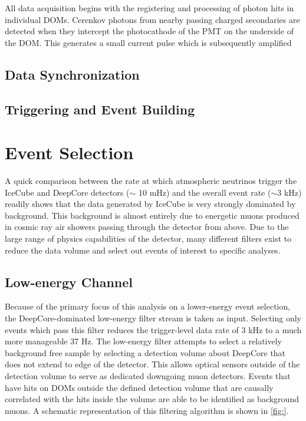 \documentclass{gatech-thesis}
\begin{document}
All data acquisition begins with the registering and processing of photon hits in individual DOMs. Cerenkov photons from nearby passing charged secondaries are detected when they intercept the photocathode of the PMT on the underside of the DOM. This generates a small current pulse which is subsequently amplified 

\section{Data Synchronization}

\section{Triggering and Event Building}


\chapter{Event Selection}
A quick comparison between the rate at which atmospheric neutrinos trigger the IceCube and DeepCore detectors ($\sim$ 10 mHz) and the overall event rate ($\sim 3$ kHz) readily shows that the data generated by IceCube is very strongly dominated by background. This background is almost entirely due to energetic muons produced in cosmic ray air showers passing through the detector from above. Due to the large range of physics capabilities of the detector, many different filters exist to reduce the data volume and select out events of interest to specific analyses. 


\section{Low-energy Channel}

Because of the primary focus of this analysis on a lower-energy event selection, the DeepCore-dominated low-energy filter stream is taken as input. Selecting only events which pass this filter reduces the trigger-level data rate of 3 kHz to a much more manageable 37 Hz. The low-energy filter attempts to select a relatively background free sample by selecting a detection volume about DeepCore that does not extend to edge of the detector. This allows optical sensors outside of the detection volume to serve as dedicated downgoing muon detectors. Events that have hits on DOMs outside the defined detection volume that are causally correlated with the hits inside the volume are able to be identified as background muons. A schematic representation of this filtering algorithm is shown in \ref{fig:}. 
\end{document}
